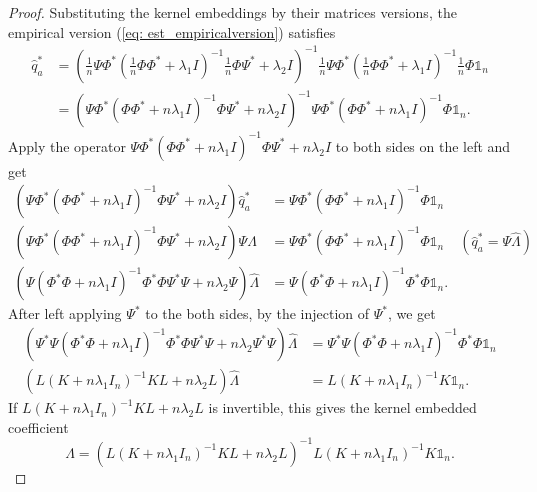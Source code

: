 \begin{proof}
    Substituting the kernel embeddings by their matrices versions, the empirical version (\ref{eq: est_empiricalversion}) satisfies
    \begin{align*}
        \label{eq: est_matricesversion}
        \widehat{q}_a^* &= (\frac{1}{n}\Psi\Phi^*(\frac{1}{n}\Phi\Phi^*+\lambda_1I)^{-1}\frac{1}{n}\Phi\Psi^*+\lambda_2I)^{-1}\frac{1}{n}\Psi\Phi^*(\frac{1}{n}\Phi\Phi^*+\lambda_1I)^{-1}\frac{1}{n}\Phi\mathds{1}_n \\
                      &= (\Psi\Phi^*(\Phi\Phi^*+n\lambda_1I)^{-1}\Phi\Psi^*+n\lambda_2I)^{-1}\Psi\Phi^*(\Phi\Phi^*+n\lambda_1I)^{-1}\Phi\mathds{1}_n.
    \end{align*}
    Apply the operator $\Psi\Phi^*(\Phi\Phi^*+n\lambda_1I)^{-1}\Phi\Psi^*+n\lambda_2I$ to both sides on the left and get
    \begin{align*}
        (\Psi\Phi^*(\Phi\Phi^*+n\lambda_1I)^{-1}\Phi\Psi^*+n\lambda_2I)\widehat{q}_a^* &= \Psi\Phi^*(\Phi\Phi^*+n\lambda_1I)^{-1}\Phi\mathds{1}_n \\
        (\Psi\Phi^*(\Phi\Phi^*+n\lambda_1I)^{-1}\Phi\Psi^*+n\lambda_2I)\Psi\widehat{\Lambda} &= \Psi\Phi^*(\Phi\Phi^*+n\lambda_1I)^{-1}\Phi\mathds{1}_n & (\widehat{q}_a^*=\Psi\widehat{\Lambda}) \\
        (\Psi(\Phi^*\Phi+n\lambda_1I)^{-1}\Phi^*\Phi\Psi^*\Psi+n\lambda_2\Psi)\widehat{\Lambda} &= \Psi(\Phi^*\Phi+n\lambda_1I)^{-1}\Phi^*\Phi\mathds{1}_n.
    \end{align*}
    After left applying $\Psi^*$ to the both sides, by the injection of $\Psi^*$, we get 
    \begin{align*}
        (\Psi^*\Psi(\Phi^*\Phi+n\lambda_1I)^{-1}\Phi^*\Phi\Psi^*\Psi+n\lambda_2\Psi^*\Psi)\widehat{\Lambda} &= \Psi^*\Psi(\Phi^*\Phi+n\lambda_1I)^{-1}\Phi^*\Phi\mathds{1}_n \\ 
        (L(K+n\lambda_1I_n)^{-1}KL+n\lambda_2L)\widehat{\Lambda} &= L(K+n\lambda_1I_n)^{-1}K\mathds{1}_n. 
    \end{align*}
    If $L(K+n\lambda_1I_n)^{-1}KL+n\lambda_2L$ is invertible, this gives the kernel embedded coefficient
    \begin{equation*}
        \widehat{\Lambda} = (L(K+n\lambda_1I_n)^{-1}KL+n\lambda_2L)^{-1}L(K+n\lambda_1I_n)^{-1}K\mathds{1}_n. 
    \end{equation*}


\end{proof}
